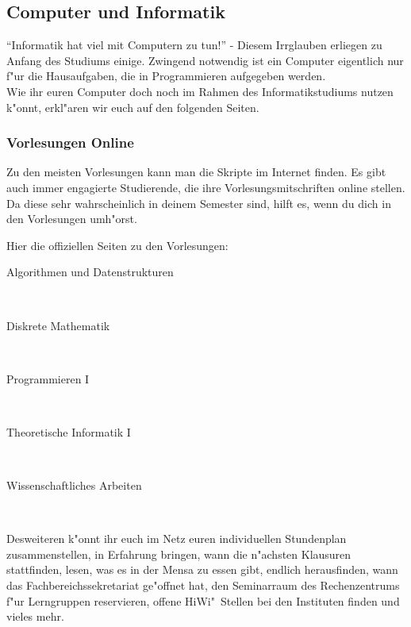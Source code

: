 \subsection{Computer und Informatik}
"`Informatik hat viel mit Computern zu tun!"' - Diesem Irrglauben erliegen zu
Anfang des Studiums einige. Zwingend notwendig ist ein Computer eigentlich nur
f"ur die Hausaufgaben, die in Programmieren aufgegeben werden.\\
Wie ihr euren Computer doch noch im Rahmen des Informatikstudiums nutzen
k"onnt, erkl"aren wir euch auf den folgenden Seiten.

\subsubsection{Vorlesungen Online}
Zu den meisten Vorlesungen kann man die Skripte im Internet finden. Es gibt auch
immer engagierte Studierende, die ihre Vorlesungsmitschriften online stellen.
Da diese sehr wahrscheinlich in deinem Semester sind, hilft es, wenn du dich
in den Vorlesungen umh"orst.\par
Hier die offiziellen Seiten zu den Vorlesungen:

\begin{description}
\item[Algorithmen und Datenstrukturen]~\\
{\footnotesize{}}
\item[Diskrete Mathematik]~\\
{\footnotesize{}}
\item[Programmieren I]~\\
{\footnotesize{}}
\item[Theoretische Informatik I]~\\
{\footnotesize{}}
\item[Wissenschaftliches Arbeiten]~\\
{\footnotesize{}}
\end{description}

Desweiteren k"onnt ihr euch im Netz euren individuellen Stundenplan
zusammenstellen, in Erfahrung bringen, wann die n"achsten Klausuren
stattfinden, lesen, was es in der Mensa zu essen gibt, endlich herausfinden,
wann das Fachbereichssekretariat ge"offnet hat, den Seminarraum des
Rechenzentrums f"ur Lerngruppen reservieren, offene HiWi"~Stellen bei den
Instituten finden und vieles mehr.

